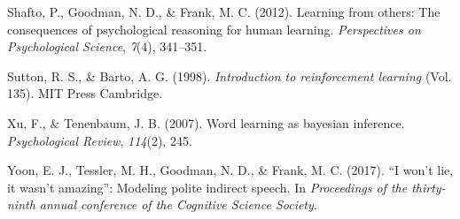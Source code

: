 \documentclass[10pt, letterpaper]{article}
\begin{document}
\hypertarget{ref-shafto2012learning}{}
Shafto, P., Goodman, N. D., \& Frank, M. C. (2012). Learning from
others: The consequences of psychological reasoning for human learning.
\emph{Perspectives on Psychological Science}, \emph{7}(4), 341--351.

\hypertarget{ref-sutton1998}{}
Sutton, R. S., \& Barto, A. G. (1998). \emph{Introduction to
reinforcement learning} (Vol. 135). MIT Press Cambridge.

\hypertarget{ref-xu2007}{}
Xu, F., \& Tenenbaum, J. B. (2007). Word learning as bayesian inference.
\emph{Psychological Review}, \emph{114}(2), 245.

\hypertarget{ref-yoon2017}{}
Yoon, E. J., Tessler, M. H., Goodman, N. D., \& Frank, M. C. (2017). ``I
won't lie, it wasn't amazing'': Modeling polite indirect speech. In
\emph{Proceedings of the thirty-ninth annual conference of the Cognitive
Science Society}.
\end{document}
